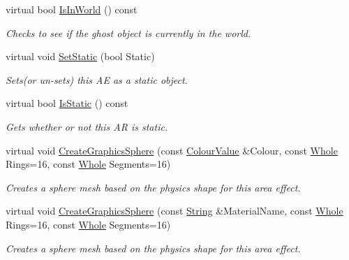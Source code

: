 \begin{DoxyCompactItemize}
virtual bool \hyperlink{classphys_1_1AreaEffect_a2ef4bb9389dd9296e680a77058609712}{IsInWorld} () const 
\begin{DoxyCompactList}\small\item\em Checks to see if the ghost object is currently in the world. \item\end{DoxyCompactList}\item 
virtual void \hyperlink{classphys_1_1AreaEffect_acc55b82b29952902c3e9a3810decf3d9}{SetStatic} (bool Static)
\begin{DoxyCompactList}\small\item\em Sets(or un-\/sets) this AE as a static object. \item\end{DoxyCompactList}\item 
virtual bool \hyperlink{classphys_1_1AreaEffect_aecdf8cb72c6182e2495cf25c01afc249}{IsStatic} () const 
\begin{DoxyCompactList}\small\item\em Gets whether or not this AR is static. \item\end{DoxyCompactList}\item 
virtual void \hyperlink{classphys_1_1AreaEffect_a6d1e8ddcea39fa441f02010af1970a16}{CreateGraphicsSphere} (const \hyperlink{classphys_1_1ColourValue}{ColourValue} \&Colour, const \hyperlink{namespacephys_a460f6bc24c8dd347b05e0366ae34f34a}{Whole} Rings=16, const \hyperlink{namespacephys_a460f6bc24c8dd347b05e0366ae34f34a}{Whole} Segments=16)
\begin{DoxyCompactList}\small\item\em Creates a sphere mesh based on the physics shape for this area effect. \item\end{DoxyCompactList}\item 
virtual void \hyperlink{classphys_1_1AreaEffect_acf78863312a29935efbfdf60c073ae3c}{CreateGraphicsSphere} (const \hyperlink{namespacephys_aa03900411993de7fbfec4789bc1d392e}{String} \&MaterialName, const \hyperlink{namespacephys_a460f6bc24c8dd347b05e0366ae34f34a}{Whole} Rings=16, const \hyperlink{namespacephys_a460f6bc24c8dd347b05e0366ae34f34a}{Whole} Segments=16)
\begin{DoxyCompactList}\small\item\em Creates a sphere mesh based on the physics shape for this area effect. \item\end{DoxyCompactList}\item 

\end{DoxyCompactItemize}
